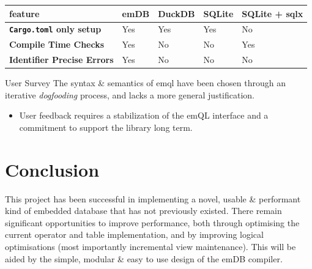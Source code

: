 \begin{center}
    \begin{tabular}{l | l l l l }
        \textbf{feature}                                  & \textbf{emDB} & \textbf{DuckDB} & \textbf{SQLite} & \textbf{SQLite + sqlx} \\
        \hline
        \textbf{\texttt{Cargo.toml} only setup} & Yes           & Yes             & Yes             & No                     \\
        \textbf{Compile Time Checks}                      & Yes           & No              & No              & Yes                    \\
        \textbf{Identifier Precise Errors}                & Yes           & No              & No              & No                     \\
    \end{tabular}
\end{center}

\begin{futurebox}{User Survey}
    The syntax \& semantics of emql have been chosen through an iterative \textit{dogfooding} process, and lacks a more general justification.
    \begin{itemize}
        \setlength\itemsep{0em}
        \item User feedback requires a stabilization of the emQL interface and a commitment to support the library long term.
    \end{itemize}
\end{futurebox}

\section{Conclusion}
This project has been successful in implementing a novel, usable \& performant kind of embedded database that has not previously existed.
There remain significant opportunities to improve performance, both through optimising the current operator and table implementation, 
and by improving logical optimisations (most importantly incremental view maintenance). This will be aided by the simple, modular \& easy 
to use design of the emDB compiler.
